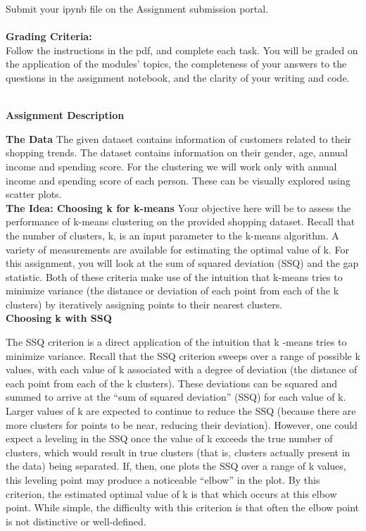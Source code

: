 \documentclass[letter-paper,12pt]{article} %
\begin{document}
Submit your ipynb file on the Assignment submission portal. \\~\\


\textbf{Grading Criteria:}\\
Follow the instructions in the pdf, and complete each task. You will be graded on the application of the modules’ topics, the completeness of your answers to the questions in the assignment notebook, and the clarity of your writing and code.\\~\\


\newpage

\begin{center}
    \Large \textbf{Assignment Description}
\end{center}

\textbf{The Data}
The given dataset contains information of customers related to their shopping trends. The dataset contains information  on their gender, age, annual income and spending score. For the clustering we will work only with annual income and spending score of each person. These can  be visually explored using scatter plots.\\



\textbf{The Idea: Choosing k for k-means}
Your objective here will be to assess the performance of k-means clustering on the provided shopping dataset. Recall that the number of clusters, k, is an input parameter to the k-means algorithm. A variety of measurements are available for estimating the optimal value of k. For this assignment, you will look at the sum of squared deviation (SSQ) and the gap statistic. Both of these criteria make use of the intuition that k-means tries to minimize variance (the distance or deviation of each point from each of the k clusters) by iteratively assigning points to their nearest clusters.\\


\textbf{Choosing k with SSQ}

The SSQ criterion is a direct application of the intuition that k -means tries to minimize variance. Recall that the SSQ criterion sweeps over a range of possible k values, with each value of k associated with a degree of deviation (the distance of each point from each of the k clusters). These deviations can be squared and summed to arrive at the “sum of squared deviation” (SSQ) for each value of k. Larger values of k are expected to continue to reduce the SSQ (because there are more clusters for points to be near, reducing their deviation). However, one could expect a leveling in the SSQ once the value of k exceeds the true number of clusters, which would result in true clusters (that is, clusters actually present in the data) being separated. If, then, one plots the SSQ over a range of k values, this leveling point may produce a noticeable “elbow” in the plot. By this criterion, the estimated optimal value of k is that which occurs at this elbow point. While simple, the difficulty with this criterion is that often the elbow point is not distinctive or well-defined.\\
\end{document}

